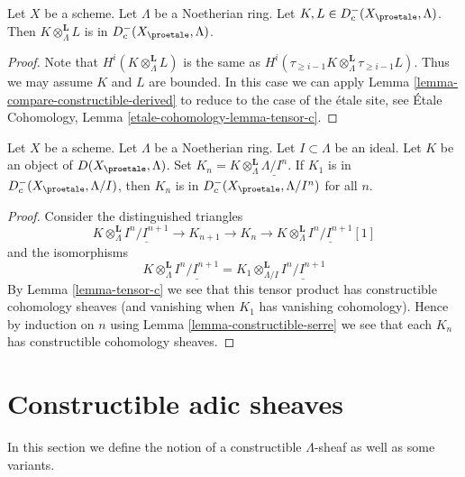 \begin{lemma}
\label{lemma-tensor-c}
Let $X$ be a scheme. Let $\Lambda$ be a Noetherian ring.
Let $K, L \in D_c^-(X_\proetale, \Lambda)$. Then
$K \otimes_\Lambda^\mathbf{L} L$ is in $D_c^-(X_\proetale, \Lambda)$.
\end{lemma}

\begin{proof}
Note that $H^i(K \otimes_\Lambda^\mathbf{L} L)$ is the same as
$H^i(\tau_{\geq i - 1}K \otimes_\Lambda^\mathbf{L} \tau_{\geq i - 1}L)$.
Thus we may assume $K$ and $L$ are bounded.
In this case we can apply Lemma \ref{lemma-compare-constructible-derived} to
reduce to the case of the \'etale site, see
\'Etale Cohomology, Lemma \ref{etale-cohomology-lemma-tensor-c}.
\end{proof}

\begin{lemma}
\label{lemma-compare-truncations-constructible}
Let $X$ be a scheme. Let $\Lambda$ be a Noetherian ring.
Let $I \subset \Lambda$ be an ideal.
Let $K$ be an object of $D(X_\proetale, \Lambda)$.
Set $K_n = K \otimes_\Lambda^\mathbf{L} \underline{\Lambda/I^n}$.
If $K_1$ is in $D^-_c(X_\proetale, \Lambda/I)$, then
$K_n$ is in $D^-_c(X_\proetale, \Lambda/I^n)$ for all $n$.
\end{lemma}

\begin{proof}
Consider the distinguished triangles
$$
K \otimes_\Lambda^\mathbf{L} \underline{I^n/I^{n + 1}} \to
K_{n + 1} \to
K_n \to
K \otimes_\Lambda^\mathbf{L} \underline{I^n/I^{n + 1}}[1]
$$
and the isomorphisms
$$
K \otimes_\Lambda^\mathbf{L} \underline{I^n/I^{n + 1}} =
K_1 \otimes_{\Lambda/I}^\mathbf{L} \underline{I^n/I^{n + 1}}
$$
By Lemma \ref{lemma-tensor-c} we see that this tensor product has
constructible cohomology sheaves (and vanishing when $K_1$ has
vanishing cohomology). Hence by induction on $n$ using
Lemma \ref{lemma-constructible-serre}
we see that each $K_n$ has constructible cohomology sheaves.
\end{proof}








\section{Constructible adic sheaves}
\label{section-adic}

\noindent
In this section we define the notion of a constructible
$\Lambda$-sheaf as well as some variants.


